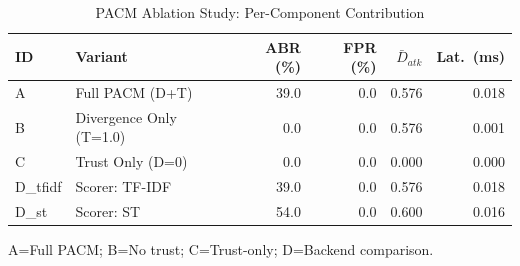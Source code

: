 \begin{table}[htbp]
  \centering \small
  \caption{PACM Ablation Study: Per-Component Contribution}
  \label{tab:ablation}
  \begin{tabular}{llrrrr}
    \toprule
    ID & Variant & ABR (\%) & FPR (\%) & $\bar{D}_{atk}$ & Lat.\ (ms) \\
    \midrule
    A & Full PACM (D+T) & 39.0 & 0.0 & 0.576 & 0.018 \\
    B & Divergence Only (T=1.0) & 0.0 & 0.0 & 0.576 & 0.001 \\
    C & Trust Only (D=0) & 0.0 & 0.0 & 0.000 & 0.000 \\
    D_tfidf & Scorer: TF-IDF & 39.0 & 0.0 & 0.576 & 0.018 \\
    D_st & Scorer: ST & 54.0 & 0.0 & 0.600 & 0.016 \\
    \bottomrule
  \end{tabular}
  \begin{tablenotes}
    \small
    \item A=Full PACM; B=No trust; C=Trust-only; D=Backend comparison.
  \end{tablenotes}
\end{table}